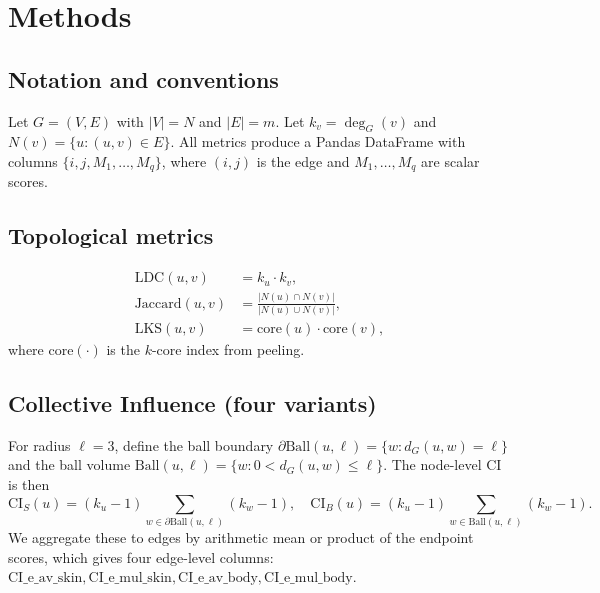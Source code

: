 \documentclass[11pt,a4paper]{article}
\begin{document}
\section{Methods}
\label{sec:methods}

\subsection{Notation and conventions}
Let $G = (V, E)$ with $|V| = N$ and $|E| = m$. Let $k_v = \deg_G(v)$ and
$N(v) = \{u : (u,v) \in E\}$. All metrics produce a Pandas DataFrame with
columns $\{i, j, M_1, \dots, M_q\}$, where $(i,j)$ is the edge and
$M_1, \dots, M_q$ are scalar scores.

\subsection{Topological metrics}
\begin{align}
\text{LDC}(u,v)     &= k_u \cdot k_v, \\
\text{Jaccard}(u,v) &= \frac{|N(u) \cap N(v)|}{|N(u) \cup N(v)|}, \\
\text{LKS}(u,v)     &= \text{core}(u) \cdot \text{core}(v),
\end{align}
where $\text{core}(\cdot)$ is the $k$-core index from peeling.

\subsection{Collective Influence (four variants)}
For radius $\ell = 3$, define the ball boundary
$\partial \text{Ball}(u, \ell) = \{w : d_G(u,w) = \ell\}$ and the ball
volume $\text{Ball}(u, \ell) = \{w : 0 < d_G(u,w) \le \ell\}$. The
node-level CI is then
\begin{equation}
\text{CI}_S(u) = (k_u - 1) \sum_{w \in \partial\text{Ball}(u, \ell)} (k_w - 1),
\quad
\text{CI}_B(u) = (k_u - 1) \sum_{w \in \text{Ball}(u, \ell)} (k_w - 1).
\end{equation}
We aggregate these to edges by arithmetic mean or product of the
endpoint scores, which gives four edge-level columns:
$\text{CI\_e\_av\_skin}, \text{CI\_e\_mul\_skin},
\text{CI\_e\_av\_body}, \text{CI\_e\_mul\_body}$.
\end{document}
